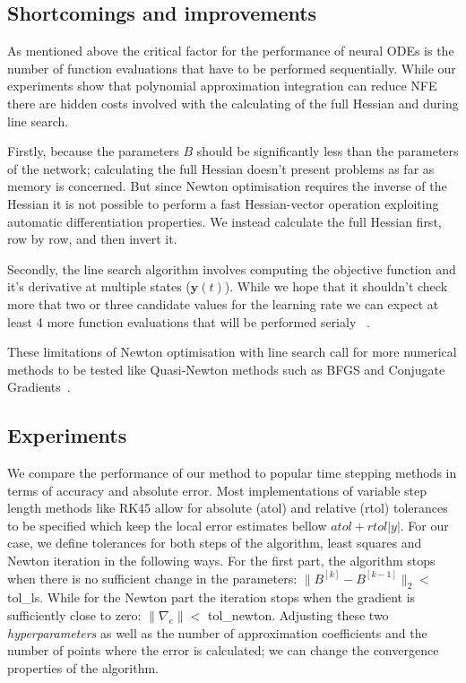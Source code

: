 \documentclass[11pt]{report}
\begin{document}
    \subsection{Shortcomings and improvements}
    As mentioned above the critical factor for the performance of neural ODEs is the number of function evaluations that
    have to be performed sequentially.
    While our experiments show that polynomial approximation integration can reduce NFE there are hidden costs involved
    with the calculating of the full Hessian and during line search.

    Firstly, because the parameters $B$ should be significantly less than the parameters of the network; calculating the
    full Hessian doesn't present problems as far as memory is concerned.
    But since Newton optimisation requires the inverse of the Hessian it is not possible to perform a fast
    Hessian-vector operation exploiting automatic differentiation properties.
    We instead calculate the full Hessian first, row by row, and then invert it.

    Secondly, the line search algorithm involves computing the objective function and it's derivative at multiple
    states ($\pmb{y}(t)$).
    While we hope that it shouldn't check more that two or three candidate values for the learning rate we can
    expect at least 4 more function evaluations that will be performed serialy ~\cite{wright2006numerical}.

    These limitations of Newton optimisation with line search call for more numerical methods to be tested like
    Quasi-Newton methods such as BFGS and Conjugate Gradients~\cite{wright2006numerical}.


    \subsection{Experiments}
    We compare the performance of our method to popular time stepping methods in terms of accuracy and absolute error.
    Most implementations of variable step length methods like RK45 allow for absolute (atol) and relative (rtol)
    tolerances to be specified which keep the local error estimates bellow $atol + rtol |y|$.
    For our case, we define tolerances for both steps of the algorithm, least squares and Newton iteration in the
    following ways.
    For the first part, the algorithm stops when there is no sufficient change in the parameters:
    $\lVert B^{[k]} - B^{[k-1]} \rVert_2 < $ tol\_ls.
    While for the Newton part the iteration stops when the gradient is sufficiently close to zero:
    $ \lVert \nabla_e \rVert < $ tol\_newton.
    Adjusting these two \textit{hyperparameters} as well as the number of approximation coefficients and the number of
    points where the error is calculated; we can change the convergence properties of the algorithm.
\end{document}
